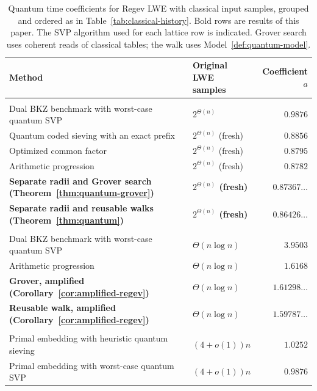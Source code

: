 \documentclass[runningheads,envcountsame,envcountsect,orivec]{llncs}
\begin{document}
\begin{table}[!t]
\centering\small
\caption{Quantum time coefficients for Regev LWE with classical
input samples, grouped and ordered as in Table~\ref{tab:classical-history}.
Bold rows are results of this paper. The SVP algorithm used for each lattice
row is indicated. Grover search uses coherent reads of classical tables;
the walk uses Model~\ref{def:quantum-model}.}
\label{tab:quantum-history}
\begin{tabularx}{\linewidth}{@{}>{\raggedright\arraybackslash}X>{\raggedright\arraybackslash}p{2.65cm}r@{}}
\toprule
Method & \shortstack[l]{Original LWE\\samples} & Coefficient $a$ \\
\midrule
\multicolumn{3}{@{}l}{\textit{$2^{\Theta(n)}$ samples}} \\
Dual BKZ benchmark with worst-case quantum SVP~\cite{HKM18,HKKL26}
  & $2^{\Theta(n)}$ & $0.9876$ \\
Quantum coded sieving with an exact prefix~\cite[Table~1]{GJMS17}
  & $2^{\Theta(n)}$ (fresh) & $0.8856$ \\
Optimized common factor~\cite[Table~III]{GJMS19}
  & $2^{\Theta(n)}$ (fresh) & $0.8795$ \\
Arithmetic progression~\cite[Table~I]{M19}
  & $2^{\Theta(n)}$ (fresh) & $0.8782$ \\
\textbf{Separate radii and Grover search (Theorem~\ref{thm:quantum-grover})}
  & \textbf{\boldmath $2^{\Theta(n)}$ (fresh)} & $\boldsymbol{0.87367\ldots}$ \\
\textbf{Separate radii and reusable walks (Theorem~\ref{thm:quantum})}
  & \textbf{\boldmath $2^{\Theta(n)}$ (fresh)} & $\boldsymbol{0.86426\ldots}$ \\
\midrule
\multicolumn{3}{@{}l}{\textit{$\Theta(n\log n)$ samples}} \\
Dual BKZ benchmark with worst-case quantum SVP~\cite{HKM18,HKKL26}
  & $\Theta(n\log n)$ & $3.9503$ \\
Arithmetic progression~\cite[Table~I]{M19}
  & $\Theta(n\log n)$ & $1.6168$ \\
\textbf{Grover, amplified (Corollary~\ref{cor:amplified-regev})}
  & \textbf{\boldmath $\Theta(n\log n)$} & $\boldsymbol{1.61298\ldots}$ \\
\textbf{Reusable walk, amplified (Corollary~\ref{cor:amplified-regev})}
  & \textbf{\boldmath $\Theta(n\log n)$} & $\boldsymbol{1.59787\ldots}$ \\
\midrule
\multicolumn{3}{@{}l}{\textit{$\Theta(n)$ samples}} \\
Primal embedding with heuristic quantum sieving~\cite{HKM18,BCSS23}
  & $(4+o(1))n$ & $1.0252$ \\
Primal embedding with worst-case quantum SVP~\cite{HKM18,HKKL26}
  & $(4+o(1))n$ & $0.9876$ \\
\bottomrule
\end{tabularx}
\end{table}
\end{document}
